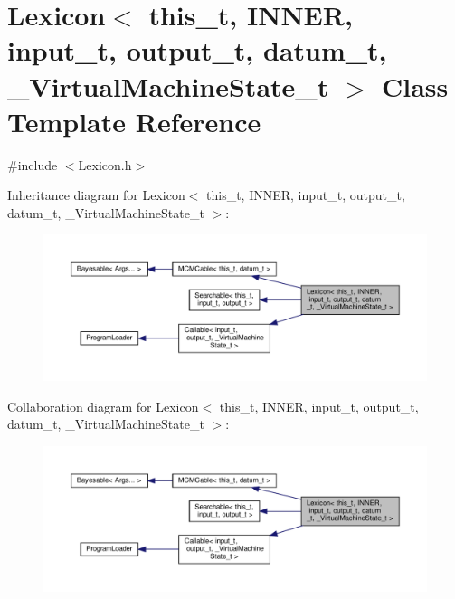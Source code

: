 \hypertarget{class_lexicon}{}\section{Lexicon$<$ this\+\_\+t, I\+N\+N\+ER, input\+\_\+t, output\+\_\+t, datum\+\_\+t, \+\_\+\+Virtual\+Machine\+State\+\_\+t $>$ Class Template Reference}
\label{class_lexicon}


{\ttfamily \#include $<$Lexicon.\+h$>$}



Inheritance diagram for Lexicon$<$ this\+\_\+t, I\+N\+N\+ER, input\+\_\+t, output\+\_\+t, datum\+\_\+t, \+\_\+\+Virtual\+Machine\+State\+\_\+t $>$\+:
\nopagebreak
\begin{figure}[H]
\begin{center}
\leavevmode
\includegraphics[width=350pt]{class_lexicon__inherit__graph}
\end{center}
\end{figure}


Collaboration diagram for Lexicon$<$ this\+\_\+t, I\+N\+N\+ER, input\+\_\+t, output\+\_\+t, datum\+\_\+t, \+\_\+\+Virtual\+Machine\+State\+\_\+t $>$\+:
\nopagebreak
\begin{figure}[H]
\begin{center}
\leavevmode
\includegraphics[width=350pt]{class_lexicon__coll__graph}
\end{center}
\end{figure}
